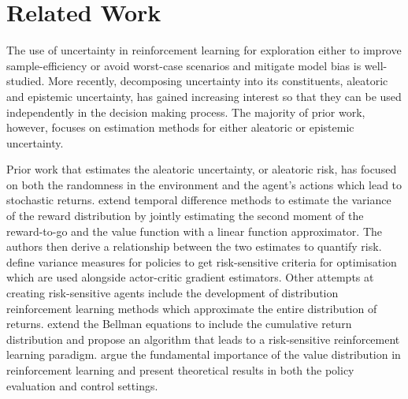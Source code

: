 \nomenclature[g-p]{$\pi$}{ $\simeq 3.14\ldots$}                                             %

\section{Related Work} %
\label{S:related-work}
The use of uncertainty in reinforcement learning for exploration either to improve sample-efficiency \citep{schneider1997exploiting}\citep{jung2010gaussian}\citep{deisenroth2011pilco} or avoid worst-case scenarios and mitigate model bias \citep{bagnell2001solving}\citep{nilim2005robust}\citep{kahn2017uncertainty}\citep{deisenroth2013gaussian} is well-studied. More recently, decomposing uncertainty into its constituents, aleatoric and epistemic uncertainty, has gained increasing interest so that they can be used independently in the decision making process. The majority of prior work, however, focuses on estimation methods for either aleatoric or epistemic uncertainty.

Prior work that estimates the aleatoric uncertainty, or aleatoric risk, has focused on both the randomness in the environment and the agent's actions which lead to stochastic returns. \citet{tamar2016learning} extend temporal difference methods to estimate the variance of the reward distribution by jointly estimating the second moment of the reward-to-go and the value function with a linear function approximator. The authors then derive a relationship between the two estimates to quantify risk. \citet{prashanth2013actor} define variance measures for policies to get risk-sensitive criteria for optimisation which are used alongside actor-critic gradient estimators. Other attempts at creating risk-sensitive agents include the development of distribution reinforcement learning methods which approximate the entire distribution of returns. \citet{morimura2010nonparametric} extend the Bellman equations to include the cumulative return distribution and propose an algorithm that leads to a risk-sensitive reinforcement learning paradigm. \citet{bellemare2017distributional} argue the fundamental importance of the value distribution in reinforcement learning and present theoretical results in both the policy evaluation and control settings. 

